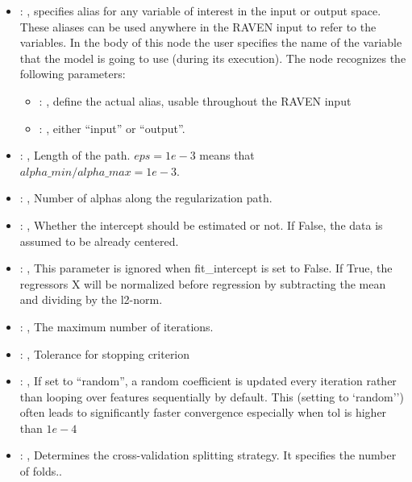 \begin{itemize}
    \item {}: , 
      specifies alias for         any variable of interest in the input or output space. These
      aliases can be used anywhere in the RAVEN input to         refer to the variables. In the body
      of this node the user specifies the name of the variable that the model is going to use
      (during its execution).
      The  node recognizes the following parameters:
        \begin{itemize}
          \item {}: , 
            define the actual alias, usable throughout the RAVEN input
          \item {}: , 
            either ``input'' or ``output''.
      \end{itemize}

    \item {}: , 
      Length of the path. $eps=1e-3$ means that $alpha\_min / alpha\_max = 1e-3$.

    \item {}: , 
      Number of alphas along the regularization path.

    \item {}: , 
      Whether the intercept should be estimated or not. If False,
      the data is assumed to be already centered.

    \item {}: , 
      This parameter is ignored when fit\_intercept is set to False. If True,
      the regressors X will be normalized before regression by subtracting the mean and
      dividing by the l2-norm.

    \item {}: , 
      The maximum number of iterations.

    \item {}: , 
      Tolerance for stopping criterion

    \item {}: , 
      If set to ``random'', a random coefficient is updated every iteration
      rather than looping over features sequentially by default. This (setting to `random'')
      often leads to significantly faster convergence especially when tol is higher than $1e-4$

    \item {}: , 
      Determines the cross-validation splitting strategy.
      It specifies the number of folds..
  \end{itemize}


